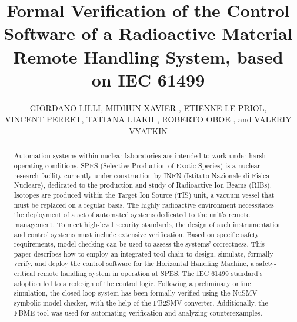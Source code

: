 \documentclass{ieeeojies}
\begin{document}
\title{Formal Verification of the Control Software of a Radioactive Material Remote Handling System, based on IEC 61499}
\author{GIORDANO LILLI, 
MIDHUN XAVIER , 
ETIENNE LE PRIOL, \\
VINCENT PERRET,
TATIANA LIAKH 
, 
ROBERTO OBOE ,
and VALERIY VYATKIN }

\address[1]{Department of Management and Engineering, University of Padova, Vicenza, Italy}
\address[2]{Laboratori Nazionali di Legnaro, Istituto Nazionale di Fisica Nucleare, Legnaro, Italy}
\address[3]{Department of Computer Science, Electrical and Space Engineering, Luleå University of Technology, Luleå, Sweden}
\address[4]{Department of Mechanical Engineering, École normale supérieure Paris-Saclay, Gif-sur-Yvette, France}
\address[5]{Department of Electrical Engineering and Automation, Aalto University, Espoo, Finland}



\linenumbers

\begin{abstract}
Automation systems within nuclear laboratories are intended to work under harsh operating conditions. SPES (Selective Production of Exotic Species) is a nuclear research facility currently under construction by INFN (Istituto Nazionale di Fisica Nucleare), dedicated to the production and study of Radioactive Ion Beams (RIBs). Isotopes are produced within the Target Ion Source (TIS) unit, a vacuum vessel that must be replaced on a regular basis. The highly radioactive environment necessitates the deployment of a set of automated systems dedicated to the unit's remote management. To meet high-level security standards, the design of such instrumentation and control systems must include extensive verification. Based on specific safety requirements, model checking can be used to assess the systems' correctness. This paper describes how to employ an integrated tool-chain to design, simulate, formally verify, and deploy the control software for the Horizontal Handling Machine, a safety-critical remote handling system in operation at SPES. The IEC 61499 standard's adoption led to a redesign of the control logic. Following a preliminary online simulation, the closed-loop system has been formally verified using the NuSMV symbolic model checker, with the help of the FB2SMV converter. Additionally, the FBME tool was used for automating verification and analyzing counterexamples.
\end{abstract}
\end{document}
